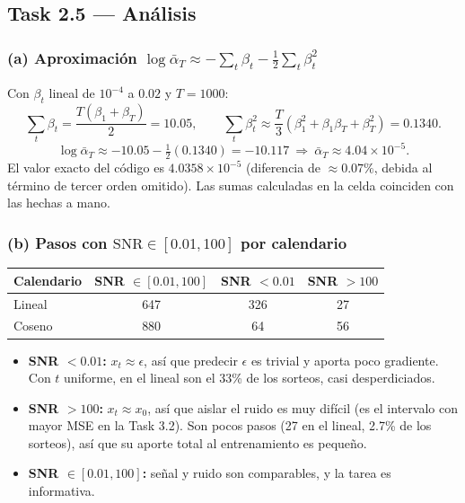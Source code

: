 \documentclass[11pt]{article}
\begin{document}
\subsection*{Task 2.5 --- Análisis}

\subsubsection*{(a) Aproximación $\log\bar\alpha_T\approx-\sum_t\beta_t-\tfrac12\sum_t\beta_t^2$}
Con $\beta_t$ lineal de $10^{-4}$ a $0.02$ y $T=1000$:
\[\sum_t\beta_t=\frac{T(\beta_1+\beta_T)}{2}=10.05,\qquad \sum_t\beta_t^2\approx\frac{T}{3}\left(\beta_1^2+\beta_1\beta_T+\beta_T^2\right)=0.1340.\]
\[\log\bar\alpha_T\approx-10.05-\tfrac12(0.1340)=-10.117\ \Rightarrow\ \bar\alpha_T\approx4.04\times10^{-5}.\]
El valor exacto del código es $4.0358\times10^{-5}$ (diferencia de $\approx0.07\%$, debida al término de tercer orden omitido). Las sumas calculadas en la celda coinciden con las hechas a mano.

\subsubsection*{(b) Pasos con $\mathrm{SNR}\in[0.01,100]$ por calendario}
\begin{table}[H]
\centering
\begin{tabular}{lccc}
\toprule
Calendario & SNR $\in[0.01,100]$ & SNR $<0.01$ & SNR $>100$ \\
\midrule
Lineal & 647 & 326 & 27 \\
Coseno & 880 & 64 & 56 \\
\bottomrule
\end{tabular}
\end{table}

\begin{itemize}
  \item \textbf{SNR $<0.01$:} $x_t\approx\epsilon$, así que predecir $\epsilon$ es trivial y aporta poco gradiente. Con $t$ uniforme, en el lineal son el 33\% de los sorteos, casi desperdiciados.
  \item \textbf{SNR $>100$:} $x_t\approx x_0$, así que aislar el ruido es muy difícil (es el intervalo con mayor MSE en la Task 3.2). Son pocos pasos (27 en el lineal, 2.7\% de los sorteos), así que su aporte total al entrenamiento es pequeño.
  \item \textbf{SNR $\in[0.01,100]$:} señal y ruido son comparables, y la tarea es informativa.
\end{itemize}
\end{document}
